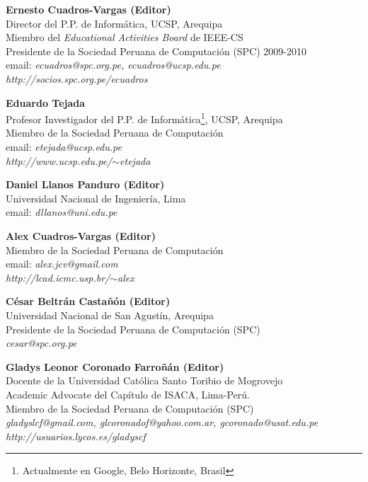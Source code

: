 \begin{center}
\textbf{Ernesto Cuadros-Vargas (Editor)}\\
Director del P.P. de Informática, UCSP, Arequipa\\
Miembro del \textit{Educational Activities Board} de IEEE-CS\\
Presidente de la Sociedad Peruana de Computación (SPC) 2009-2010\\
email: \textit{ecuadros@spc.org.pe, ecuadros@ucsp.edu.pe}\\
\textit{http://socios.spc.org.pe/ecuadros}
\end{center}

\begin{center}
\textbf{Eduardo Tejada}\\
Profesor Investigador del P.P. de Informática\footnote{Actualmente en Google, Belo Horizonte, Brasil}, UCSP, Arequipa\\
Miembro de la Sociedad Peruana de Computación\\
email: \textit{etejada@ucsp.edu.pe}\\
\textit{http://www.ucsp.edu.pe/$\sim$etejada}
\end{center}

\begin{center}
\textbf{Daniel Llanos Panduro (Editor)}\\
Universidad Nacional de Ingeniería, Lima\\
email: \textit{dllanos@uni.edu.pe}\\
\end{center}

\begin{center}
\textbf{Alex Cuadros-Vargas (Editor)}\\
Miembro de la Sociedad Peruana de Computación\\
email: \textit{alex.jcv@gmail.com}\\
\textit{http://lcad.icmc.usp.br/$\sim$alex}
\end{center}

\begin{center}
\textbf{César Beltrán Castañón (Editor)}\\
Universidad Nacional de San Agustín, Arequipa\\
Presidente de la Sociedad Peruana de Computación (SPC)\\
\textit{cesar@spc.org.pe}
\end{center}

\begin{center}
\textbf{Gladys Leonor Coronado Farroñán (Editor)}\\
Docente de la Universidad Católica Santo Toribio de Mogrovejo\\
Academic Advocate del Capítulo de ISACA, Lima-Perú.\\
Miembro de la Sociedad Peruana de Computación (SPC)\\
\textit{gladyslcf@gmail.com, glcoronadof@yahoo.com.ar, gcoronado@usat.edu.pe}\\
\textit{http://usuarios.lycos.es/gladyscf}
\end{center}

